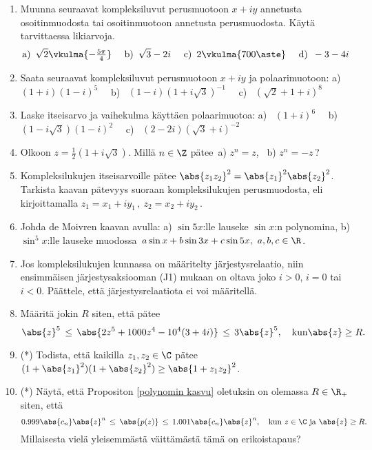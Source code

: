 \Harj
\begin{enumerate}

\item
Muunna seuraavat kompleksiluvut perusmuotoon $x+iy$ annetusta osoitinmuodosta tai 
osoitinmuotoon annetusta perusmuodosta. Käytä tarvittaessa likiarvoja.
\[
\text{a)}\,\ \sqrt{2}\vkulma{-\tfrac{5\pi}{4}} \quad\
\text{b)}\,\ \sqrt{3}-2i \quad\
\text{c)}\,\ 2\vkulma{700\aste} \quad\
\text{d)}\,\ -3-4i 
\]

\item
Saata seuraavat kompleksiluvut perusmuotoon $x+iy$ ja polaarimuotoon: \newline
a) \ $(1+i)(1-i)^5 \quad$ 
b) \ $(1-i)(1+i\sqrt{3})^{-1} \quad$
c) \ $(\sqrt{2}+1+i)^8$

\item
Laske itseisarvo ja vaihekulma käyttäen polaarimuotoa: \newline
a) \ $(1+i)^6 \quad$ 
b) \ $(1-i\sqrt{3})(1-i)^2 \quad$
c) \ $(2-2i)(\sqrt{3}+i)^{-2}$

\item
Olkoon $z=\tfrac{1}{2}(1+i\sqrt{3})$. Millä $n\in\Z$ pätee\, a) $z^n=z$, \ b) $z^n=-z$\,?

\item
Kompleksilukujen itseisarvoille pätee $\abs{z_1 z_2}^2=\abs{z_1}^2\abs{z_2}^2$. Tarkista kaavan
pätevyys suoraan kompleksilukujen perusmuodosta, eli kirjoittamalla \newline
$z_1=x_1+iy_1\,, \ z_2=x_2+iy_2\,$.

\item
Johda de Moivren kaavan avulla: \newline 
a) $\sin 5x$:lle lauseke $\sin x$:n polynomina, \newline
b) $\sin^5x$:lle lauseke muodossa $\,a\sin x+b\sin 3x+c\sin 5x,\ a,b,c\in\R$.

\item
Jos kompleksilukujen kunnassa on määritelty järjestysrelaatio, niin ensimmäisen
järjestysaksiooman (J1) mukaan on oltava joko $i>0$, $i=0$ tai $i<0$. Päättele, että
järjestysrelaatiota ei voi määritellä.

\item
Määritä jokin $R$ siten, että pätee
\[
\abs{z}^5\,\le\,\abs{2z^5+1000z^4-10^4(3+4i)}\,\le\,3\abs{z}^5, \quad 
                                                                    \text{kun} \abs{z} \ge R.
\]

\item (*)
Todista, että kaikilla $z_1,z_2\in\C$ pätee $(1+\abs{z_1}^2)(1+\abs{z_2}^2)\ge\abs{1+z_1z_2}^2$.

\item (*) \label{H-III-2: polynomin kasvu}
Näytä, että Propositon \ref{polynomin kasvu} oletuksin on olemassa $R\in\R_+$ siten, että
\[
0.999\abs{c_n}\abs{z}^n\,\le\,\abs{p(z)}\,\le\,1.001\abs{c_n}\abs{z}^n,\quad 
                                        \text{kun} \ z \in \C\ \text{ja}\ \abs{z} \ge R.
\]
Millaisesta vielä yleisemmästä väittämästä tämä on erikoistapaus?

\end{enumerate}